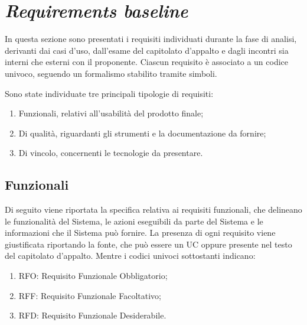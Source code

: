 \section{\textit{Requirements baseline}}

In questa sezione sono presentati i requisiti individuati durante la fase di analisi, derivanti dai casi d'uso, dall'esame del capitolato d'appalto e dagli incontri
sia interni che esterni con il proponente. Ciascun requisito è associato a un codice univoco, seguendo un formalismo stabilito tramite simboli.

Sono state individuate tre principali tipologie di requisiti:
\begin{enumerate}
	\item Funzionali, relativi all'usabilità del prodotto finale;
	\item Di qualità, riguardanti gli strumenti e la documentazione da fornire;
	\item Di vincolo, concernenti le tecnologie da presentare.
\end{enumerate}

\subsection{Funzionali}
\label{sec:funzionali}

Di seguito viene riportata la specifica relativa ai requisiti funzionali, che delineano le funzionalità del Sistema, le azioni eseguibili
da parte del Sistema e le informazioni che il Sistema può fornire. La presenza di ogni requisito viene giustificata riportando la fonte, che può essere un UC oppure presente
nel testo del capitolato d'appalto. Mentre i codici univoci sottostanti indicano:
\begin{enumerate}
	\item RFO: Requisito Funzionale Obbligatorio;
	\item RFF: Requisito Funzionale Facoltativo;
	\item RFD: Requisito Funzionale Desiderabile.
\end{enumerate}


